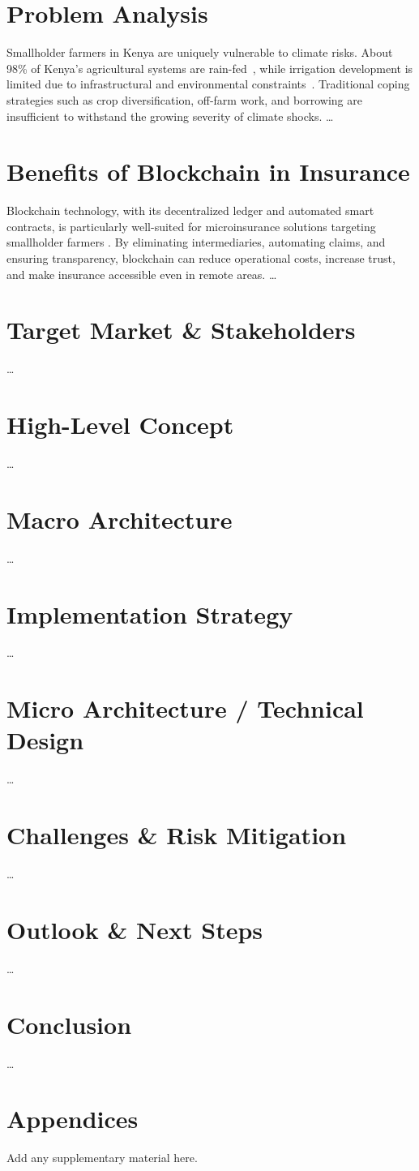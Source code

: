 \documentclass[11pt,a4paper]{article}
\begin{document}
    \section*{Problem Analysis}
    Smallholder farmers in Kenya are uniquely vulnerable to climate risks.
    About 98\% of Kenya’s agricultural systems are rain-fed~\parencite{GoK2017}, while irrigation development is limited due to infrastructural and environmental constraints~\parencite{WairimuND}.
    Traditional coping strategies such as crop diversification, off-farm work, and borrowing are insufficient to withstand the growing severity of climate shocks. \ldots

    \section*{Benefits of Blockchain in Insurance}
    Blockchain technology, with its decentralized ledger and automated smart contracts, is particularly well-suited for microinsurance solutions targeting smallholder farmers \parencite{Dominguez2024,Shetty2022}.
    By eliminating intermediaries, automating claims, and ensuring transparency, blockchain can reduce operational costs, increase trust, and make insurance accessible even in remote areas. \ldots

    \section*{Target Market \& Stakeholders}
    \ldots

    \section*{High-Level Concept}
    \ldots

    \section*{Macro Architecture}
    \ldots

    \section*{Implementation Strategy}
    \ldots

    \section*{Micro Architecture / Technical Design}
    \ldots

    \section*{Challenges \& Risk Mitigation}
    \ldots

    \section*{Outlook \& Next Steps}
    \ldots

    \section*{Conclusion}
    \ldots

    \printbibliography

    \appendix
    \section*{Appendices}
    Add any supplementary material here.
\end{document}
